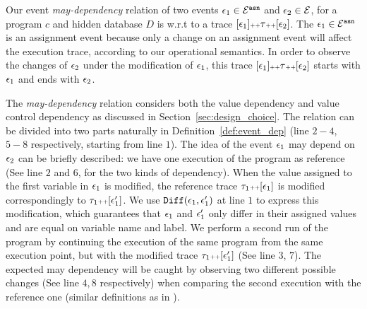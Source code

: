 Our event \emph{may-dependency} relation of 
two events $\mathtt{\epsilon}_1 \in \mathcal{E}^{\mathtt{{asn}}}$ and $\mathtt{\epsilon}_2 \in \mathcal{E}$, 
for a program $c$ and hidden database $D$ is w.r.t to
a trace $[\mathtt{\epsilon}_1 ] {\scriptscriptstyle ++} \mathtt{\tau} {\scriptscriptstyle ++} [\mathtt{\epsilon}_2]$.
The $\mathtt{\epsilon}_1 \in \mathcal{E}^{\mathtt{{asn}}}$ is an assignment event because only a change on an assignment event will affect the execution trace, according to our operational semantics.
In order to observe the changes of $\mathtt{\epsilon}_2$ under the modification of $\mathtt{\epsilon}_1$, this trace 
$[\mathtt{\epsilon}_1 ] {\scriptscriptstyle ++} \mathtt{\tau} {\scriptscriptstyle ++} [\mathtt{\epsilon}_2]$
starts with $\mathtt{\epsilon}_1$ and ends with $\mathtt{\epsilon}_2$.
{The \emph{may-dependency} relation considers both the value dependency and value control dependency as discussed in Section~\ref{sec:design_choice}. The relation can be divided into two parts naturally in Definition~\ref{def:event_dep} (line $2-4$, $5-8$ respectively, starting from line $1$). The idea of the event $\mathtt{\epsilon}_1$ may depend on $\mathtt{\epsilon}_2$ can be briefly described:
we have one execution of the program as reference (See line $2$ and $6$, for the two kinds of dependency). 
When the value assigned to the 
first variable in $\mathtt{\epsilon}_1$ is modified, the reference trace $\mathtt{\tau}_1 {\scriptscriptstyle ++} [\mathtt{\epsilon}_1]$ is modified correspondingly to $\mathtt{\tau}_1 {\scriptscriptstyle ++} [\mathtt{\epsilon}_1']$.
We use $\mathtt{Diff}(\mathtt{\epsilon}_1, \mathtt{\epsilon}_1')$ at line $1$ to express this modification, which guarantees that $\mathtt{\epsilon}_1$ and $\mathtt{\epsilon}_1'$ only differ in their assigned values and are equal on variable name and label. We perform a second run of the program by continuing the execution of the same program from the same execution point, 
but with the modified trace $\mathtt{\tau}_1 {\scriptscriptstyle ++} [\mathtt{\epsilon}_1']$ (See line $3$, $7$). 
The expected may dependency will be caught by observing two different possible changes (See line $4, 8$ respectively) when comparing the second execution with the reference one (similar definitions as in \cite{Cousot19a}). 

}
